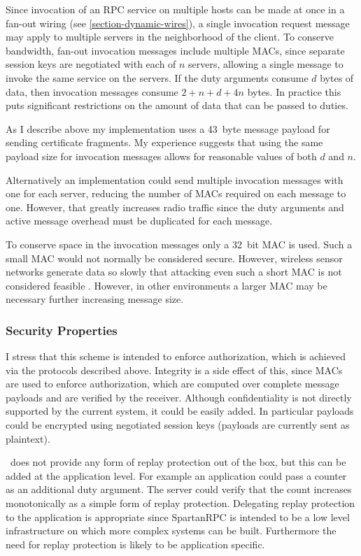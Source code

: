 Since invocation of an RPC service on multiple hosts can be made at once in a fan-out wiring
(see \autoref{section-dynamic-wires}), a single invocation request message may apply to multiple
servers in the neighborhood of the client. To conserve bandwidth, fan-out invocation messages
include multiple MACs, since separate session keys are negotiated with each of $n$ servers,
allowing a single message to invoke the same service on the servers. If the duty arguments
consume $d$ bytes of data, then invocation messages consume $2 + n + d + 4n$ bytes. In practice
this puts significant restrictions on the amount of data that can be passed to duties.

As I describe above my implementation uses a 43~byte message payload for sending certificate
fragments. My experience suggests that using the same payload size for invocation messages
allows for reasonable values of both $d$ and $n$.

Alternatively an implementation could send multiple invocation messages with one for each
server, reducing the number of MACs required on each message to one. However, that greatly
increases radio traffic since the duty arguments and active message overhead must be duplicated
for each message.

To conserve space in the invocation messages only a 32~bit MAC is used. Such a small MAC would
not normally be considered secure. However, wireless sensor networks generate data so slowly
that attacking even such a short MAC is not considered feasible
\cite{karlog-tinysec-2004,luk-minisec-2007}. However, in other environments a larger MAC may be
necessary further increasing message size.


\subsubsection{Security Properties}
\label{section-security-properties}

I stress that this scheme is intended to enforce authorization, which is achieved via the
protocols described above. Integrity is a side effect of this, since MACs are used to enforce
authorization, which are computed over complete message payloads and are verified by the
receiver. Although confidentiality is not directly supported by the current system, it could be
easily added. In particular payloads could be encrypted using negotiated session keys (payloads
are currently sent as plaintext).

\Sprocket\ does not provide any form of replay protection out of the box, but this can be added
at the application level. For example an application could pass a counter as an additional duty
argument. The server could verify that the count increases monotonically as a simple form of
replay protection. Delegating replay protection to the application is appropriate since
SpartanRPC is intended to be a low level infrastructure on which more complex systems can be
built. Furthermore the need for replay protection is likely to be application specific.

